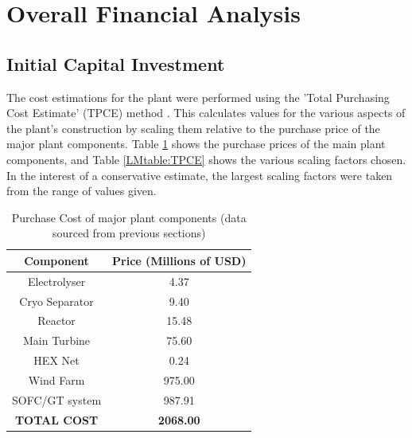 



%

\section{Overall Financial Analysis}
\label{LMCostsection}

\subsection{Initial Capital Investment}
The cost estimations for the plant were performed using the 'Total Purchasing Cost Estimate' (TPCE) method \cite{KLM}. This calculates values for the various aspects of the plant's construction by scaling them relative to the purchase price of the major plant components. Table \ref{LMtable:componentPC} shows the purchase prices of the main plant components, and Table \ref{LMtable:TPCE} shows the various scaling factors chosen. In the interest of a conservative estimate, the largest scaling factors were taken from the range of values given.


\begin{table}[h]
\centering
\caption{Purchase Cost of major plant components (data sourced from previous sections)}
\label{LMtable:componentPC}
\begin{tabular}{|c|c|}
\hline
\textbf{Component}  & \textbf{Price (Millions of USD)} \\ \hline
Electrolyser        & 4.37                             \\ \hline
Cryo Separator      & 9.40                             \\ \hline
Reactor             & 15.48                             \\ \hline
Main Turbine        & 75.60                            \\ \hline
HEX Net             & 0.24                             \\ \hline
Wind Farm           & 975.00                           \\ \hline
SOFC/GT system      & 987.91                           \\ \hline
\textbf{TOTAL COST} & \textbf{2068.00}                 \\ \hline
\end{tabular}
\end{table}

